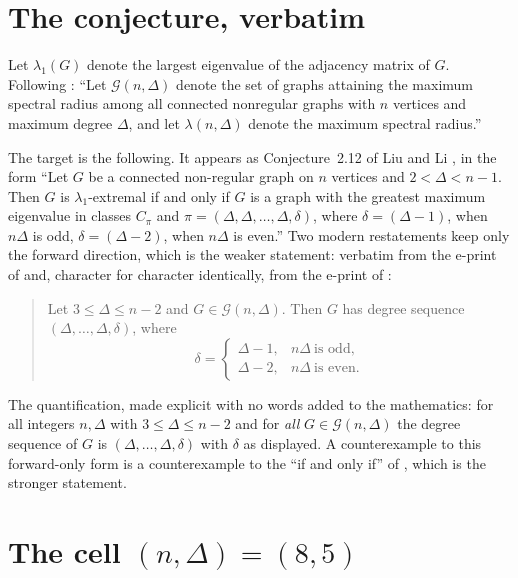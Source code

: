 \documentclass[11pt]{amsart}
\theoremstyle{definition}
\begin{document}
\section{The conjecture, verbatim}\label{sec:conj}

Let $\lambda_1(G)$ denote the largest eigenvalue of the adjacency matrix of $G$.
Following \cite[Section on extreme eigenvalues of nonregular
graphs]{LiuNing}: ``Let $\mathcal{G}(n,\Delta)$ denote the set of graphs
attaining the maximum spectral radius among all connected nonregular graphs with
$n$ vertices and maximum degree $\Delta$, and let $\lambda(n,\Delta)$ denote the
maximum spectral radius.''

The target is the following. It appears as Conjecture~2.12 of Liu and Li
\cite{LiuLi}, in the form ``Let $G$ be a connected non-regular graph on $n$
vertices and $2<\Delta<n-1$. Then $G$ is $\lambda_1$-extremal if and only if $G$
is a graph with the greatest maximum eigenvalue in classes $C_\pi$ and
$\pi=(\Delta,\Delta,\dots,\Delta,\delta)$, where $\delta=(\Delta-1)$, when
$n\Delta$ is odd, $\delta=(\Delta-2)$, when $n\Delta$ is even.'' Two modern
restatements keep only the forward direction, which is the weaker statement:
verbatim from the e-print of \cite{LiuNing} and, character for character
identically, from the e-print of \cite{Liu2024}:

\begin{quote}
Let $3\leq\Delta\leq n-2$ and $G\in\mathcal{G}(n,\Delta)$. Then $G$ has degree
sequence $(\Delta,\ldots,\Delta,\delta)$, where
\[
\delta =
\begin{cases}
\Delta-1, & n\Delta\ \text{is odd},\\
\Delta-2, & n\Delta\ \text{is even}.
\end{cases}
\]
\end{quote}

The quantification, made explicit with no words added to the mathematics: for
all integers $n,\Delta$ with $3\le\Delta\le n-2$ and for \emph{all}
$G\in\mathcal{G}(n,\Delta)$ the degree sequence of $G$ is
$(\Delta,\dots,\Delta,\delta)$ with $\delta$ as displayed. A counterexample to
this forward-only form is a counterexample to the ``if and only if'' of
\cite{LiuLi}, which is the stronger statement.

\section{The cell \texorpdfstring{$(n,\Delta)=(8,5)$}{(n,Delta)=(8,5)}}
\label{sec:cell}
\end{document}
